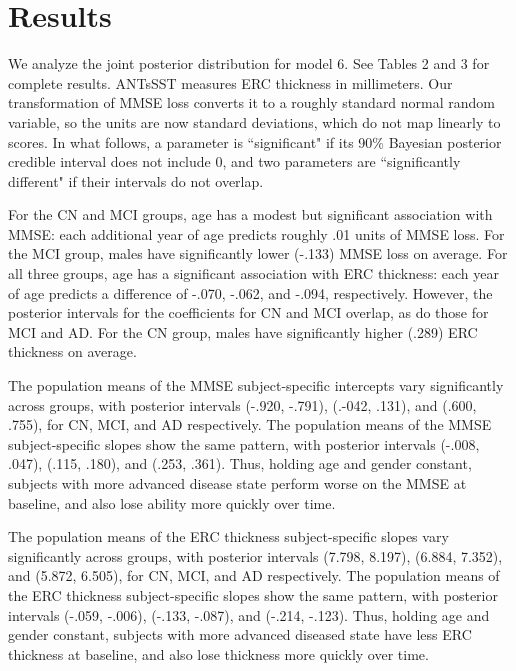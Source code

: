 \documentclass[12pt]{article}
\begin{document}
\pagebreak
\section{Results}

We analyze the joint posterior distribution for model 6. See Tables 2 and 3 for complete results. ANTsSST measures ERC thickness in millimeters. Our transformation of MMSE loss converts it to a roughly standard normal random variable, so the units are now standard deviations, which do not map linearly to scores. In what follows, a parameter is ``significant" if its 90\% Bayesian posterior credible interval does not include 0, and two parameters are ``significantly different" if their intervals do not overlap. 

For the CN and MCI groups, age has a modest but significant association with MMSE: each additional year of age predicts roughly .01 units of MMSE loss. For the MCI group, males have significantly lower (-.133) MMSE loss on average. For all three groups, age has a significant association with ERC thickness: each year of age predicts a difference of -.070, -.062, and -.094, respectively. However, the posterior intervals for the coefficients for CN and MCI overlap, as do those for MCI and AD. For the CN group, males have significantly higher (.289) ERC thickness on average. 

The population means of the MMSE subject-specific intercepts vary significantly across groups, with posterior intervals (-.920, -.791), (.-042, .131), and (.600, .755), for CN, MCI, and AD respectively. The population means of the MMSE subject-specific slopes show the same pattern, with posterior intervals (-.008, .047), (.115, .180), and (.253, .361). Thus, holding age and gender constant, subjects with more advanced disease state perform worse on the MMSE at baseline, and also lose ability more quickly over time. 

The population means of the ERC thickness subject-specific slopes vary significantly across groups, with posterior intervals (7.798, 8.197), (6.884, 7.352), and (5.872, 6.505), for CN, MCI, and AD respectively. The population means of the ERC thickness subject-specific slopes show the same pattern, with posterior intervals (-.059, -.006), (-.133, -.087), and (-.214, -.123). Thus, holding age and gender constant, subjects with more advanced diseased state have less ERC thickness at baseline, and also lose thickness more quickly over time. 
\end{document}
